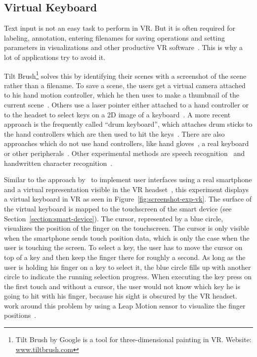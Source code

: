 \subsection{Virtual Keyboard}\label{subsection:virtual-keyboard}

Text input is not an easy task to perform in \ac{VR}. But it is often required for labeling, annotation, entering filenames for saving operations and setting parameters in visualizations and other productive \ac{VR} software~\cite[2154]{Rhoton.2002}. This is why a lot of applications try to avoid it. 

Tilt Brush\footnote{Tilt Brush by Google is a tool for three-dimensional painting in VR. Website: \href{https://www.tiltbrush.com/}{www.tiltbrush.com}} solves this by identifying their scenes with a screenshot of the scene rather than a filename. To save a scene, the users get a virtual camera attached to his hand motion controller, which he then uses to make a thumbnail of the current scene~\cite{GoogleLLC.2019}. %
Others use a laser pointer either attached to a hand controller or to the headset to select keys on a \ac{2D} image of a keyboard~\cite{WeelcoInc.2017}. A more recent approach is the frequently called \enquote{drum keyboard}, which attaches drum sticks to the hand controllers which are then used to hit the keys~\cite{Weisel.2017}. 
There are also approaches which do not use hand controllers, like hand gloves~\cite{Evans.1999,Rhoton.2002}, a real keyboard~\cite{McGill.2015,Walker.2017} or other peripherals~\cite[111\psq]{Gonzalez.2009}. Other experimental methods are speech recognition~\cite[2154\psqq]{Rhoton.2002} and handwritten character recognition~\cite[113]{Gonzalez.2009}.

Similar to the approach by~\citeauthor{Dias.2018} to implement user interfaces using a real smartphone and a virtual representation visible in the \ac{VR} headset~\cite[5]{Dias.2018}, this experiment displays a virtual keyboard in \ac{VR} as seen in Figure~\ref{fig:screenshot-exp-vk}. 
The surface of the virtual keyboard is mapped to the touchscreen of the smart device (see Section~\ref{section:smart-device}). The cursor, represented by a blue circle, visualizes the position of the finger on the touchscreen. The cursor is only visible when the smartphone sends touch position data, which is only the case when the user is touching the screen. To select a key, the user has to move the cursor on top of a key and then keep the finger there for roughly a second. As long as the user is holding his finger on a key to select it, the blue circle fills up with another circle to indicate the running selection progress. When executing the key press on the first touch and without a cursor, the user would not know which key he is going to hit with his finger, because his sight is obscured by the \ac{VR} headset. \citeauthor{Dias.2018} work around this problem by using a Leap Motion sensor to visualize the finger positions~\cite[4]{Dias.2018}.


